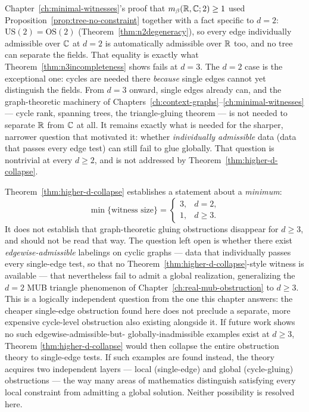 \begin{remark}[Why this inverts, rather than extends, the $d=2$ result]
Chapter~\ref{ch:minimal-witnesses}'s proof that $m_\beta(\mathbb{R},\mathbb{C};2)\ge1$ used
Proposition~\ref{prop:tree-no-constraint} together with a fact specific to
$d=2$: $\mathrm{US}(2)=\mathrm{OS}(2)$ (Theorem~\ref{thm:n2degeneracy}), so
every edge individually admissible over $\mathbb{C}$ at $d=2$ is automatically
admissible over $\mathbb{R}$ too, and no tree can separate the fields. That
equality is exactly what Theorem~\ref{thm:n3incompleteness} shows fails at
$d=3$. The $d=2$ case is the exceptional one: cycles are needed there
\emph{because} single edges cannot yet distinguish the fields. From $d=3$
onward, single edges already can, and the graph-theoretic machinery of
Chapters~\ref{ch:context-graphs}--\ref{ch:minimal-witnesses} — cycle rank,
spanning trees, the triangle-gluing theorem — is not needed to separate
$\mathbb{R}$ from $\mathbb{C}$ at all. It remains exactly what is needed for the sharper,
narrower question that motivated it: whether \emph{individually admissible}
data (data that passes every edge test) can still fail to glue globally.
That question is nontrivial at every $d\ge2$, and is not addressed by
Theorem~\ref{thm:higher-d-collapse}.
\end{remark}

\begin{remark}
\label{rem:minimum-not-classification}
Theorem~\ref{thm:higher-d-collapse} establishes a statement about a
\emph{minimum}:
\begin{equation}
\min\{\text{witness size}\} = \begin{cases} 3, & d=2, \\ 1, & d \ge 3.
\end{cases}
\end{equation}
It does not establish that graph-theoretic gluing obstructions disappear
for $d\ge3$, and should not be read that way. The question left open is
whether there exist \emph{edgewise-admissible} labelings on cyclic graphs
— data that individually passes every single-edge test, so that no
Theorem~\ref{thm:higher-d-collapse}-style witness is available — that
nevertheless fail to admit a global realization, generalizing the $d=2$
MUB triangle phenomenon of Chapter~\ref{ch:real-mub-obstruction} to
$d\ge3$. This is a logically independent question from the one this
chapter answers: the cheaper single-edge obstruction found here does not
preclude a separate, more expensive cycle-level obstruction also existing
alongside it. If future work shows no such edgewise-admissible-but-
globally-inadmissible examples exist at $d\ge3$, Theorem
\ref{thm:higher-d-collapse} would then collapse the entire obstruction
theory to single-edge tests. If such examples are found instead, the
theory acquires two independent layers — local (single-edge) and global
(cycle-gluing) obstructions — the way many areas of mathematics
distinguish satisfying every local constraint from admitting a global
solution. Neither possibility is resolved here.
\end{remark}

